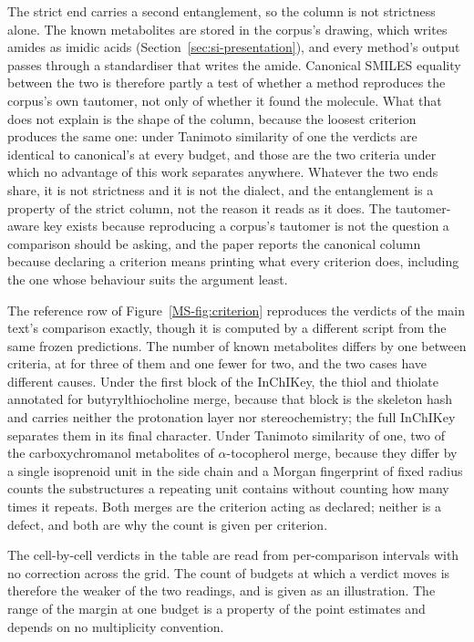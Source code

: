 \documentclass[journal=jcisd8,manuscript=suppinfo,layout=onecolumn]{achemso}
\begin{document}
The strict end carries a second entanglement, so the column is not strictness alone. The known metabolites
are stored in the corpus's drawing, which writes amides as
imidic acids (Section~\ref{sec:si-presentation}), and every method's output passes through a
standardiser that writes the amide. Canonical SMILES equality between the two is therefore partly
a test of whether a method reproduces the corpus's own tautomer, not only of whether it found
the molecule. What that does not explain is the shape of the column, because the loosest
criterion produces the same one: under Tanimoto similarity of one the verdicts are identical to
canonical's at every budget, and those are the two criteria under which no advantage of this
work separates anywhere. Whatever the two ends share, it is not strictness and it is not the
dialect, and the entanglement is a property of the strict column, not the reason it reads as it
does. The tautomer-aware key exists because
reproducing a corpus's tautomer is not the question a comparison should be asking, and the
paper reports the canonical column because declaring a criterion means printing what every
criterion does, including the one whose behaviour suits the argument least.

The reference row of Figure~\ref{MS-fig:criterion} reproduces the verdicts of the main text's
comparison exactly, though it is computed by a different script from the same frozen predictions.
The number of known metabolites differs by one between criteria, at \numPopulationReferences{} for three
of them and one fewer for two, and the two cases have different causes. Under the first block of
the InChIKey, the thiol and thiolate annotated for butyrylthiocholine merge, because that block is
the skeleton hash and carries neither the protonation layer nor stereochemistry; the full InChIKey
separates them in its final character. Under Tanimoto similarity of one, two of the carboxychromanol
metabolites of $\alpha$-tocopherol merge, because they differ by a single isoprenoid unit in the
side chain and a Morgan fingerprint of fixed radius counts the substructures a repeating unit
contains without counting how many times it repeats. Both
merges are the criterion acting as declared; neither is a defect, and both are why the count is
given per criterion.


The cell-by-cell verdicts in the table are read from per-comparison intervals with no correction
across the grid. The count of budgets at which a verdict moves is therefore the weaker of the two
readings, and is given as an illustration. The range of the margin at one budget is a property of
the point estimates and depends on no multiplicity convention.
\end{document}
